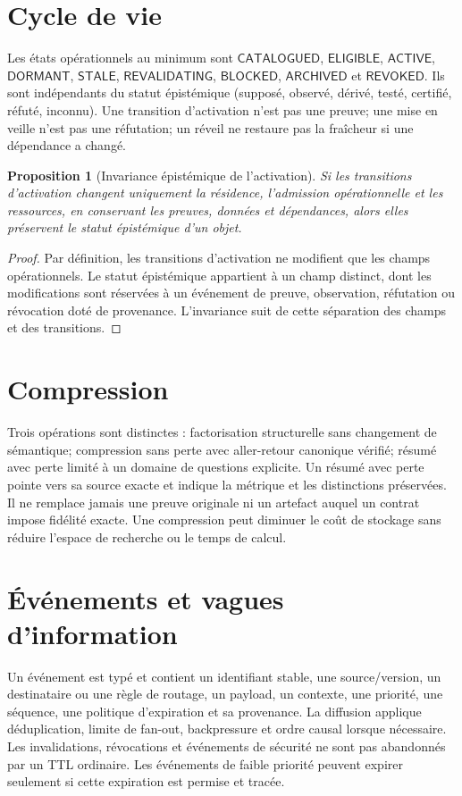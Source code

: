 \documentclass[11pt,a4paper,openany]{book}
\theoremstyle{definition}
\theoremstyle{plain}
\newtheorem{proposition}[definition]{Proposition}
\theoremstyle{remark}
\begin{document}
\section{Cycle de vie}
Les états opérationnels au minimum sont $\mathsf{CATALOGUED}$, $\mathsf{ELIGIBLE}$, $\mathsf{ACTIVE}$, $\mathsf{DORMANT}$, $\mathsf{STALE}$, $\mathsf{REVALIDATING}$, $\mathsf{BLOCKED}$, $\mathsf{ARCHIVED}$ et $\mathsf{REVOKED}$. Ils sont indépendants du statut épistémique (supposé, observé, dérivé, testé, certifié, réfuté, inconnu). Une transition d'activation n'est pas une preuve; une mise en veille n'est pas une réfutation; un réveil ne restaure pas la fraîcheur si une dépendance a changé.

\begin{proposition}[Invariance épistémique de l'activation]
Si les transitions d'activation changent uniquement la résidence, l'admission opérationnelle et les ressources, en conservant les preuves, données et dépendances, alors elles préservent le statut épistémique d'un objet.
\end{proposition}
\begin{proof}
Par définition, les transitions d'activation ne modifient que les champs opérationnels. Le statut épistémique appartient à un champ distinct, dont les modifications sont réservées à un événement de preuve, observation, réfutation ou révocation doté de provenance. L'invariance suit de cette séparation des champs et des transitions.
\end{proof}

\section{Compression}
Trois opérations sont distinctes : factorisation structurelle sans changement de sémantique; compression sans perte avec aller-retour canonique vérifié; résumé avec perte limité à un domaine de questions explicite. Un résumé avec perte pointe vers sa source exacte et indique la métrique et les distinctions préservées. Il ne remplace jamais une preuve originale ni un artefact auquel un contrat impose fidélité exacte. Une compression peut diminuer le coût de stockage sans réduire l'espace de recherche ou le temps de calcul.

\section{Événements et vagues d'information}
Un événement est typé et contient un identifiant stable, une source/version, un destinataire ou une règle de routage, un payload, un contexte, une priorité, une séquence, une politique d'expiration et sa provenance. La diffusion applique déduplication, limite de fan-out, backpressure et ordre causal lorsque nécessaire. Les invalidations, révocations et événements de sécurité ne sont pas abandonnés par un TTL ordinaire. Les événements de faible priorité peuvent expirer seulement si cette expiration est permise et tracée.
\end{document}
